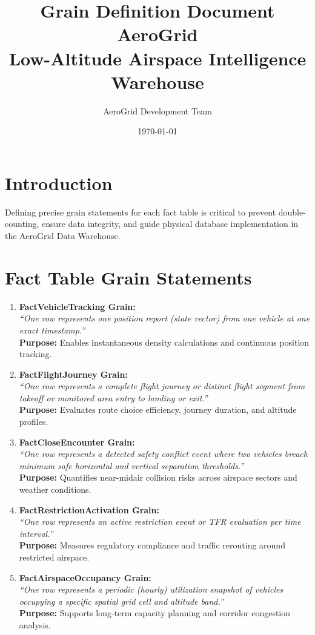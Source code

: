 \documentclass[11pt,a4paper]{article}
\title{\textbf{Grain Definition Document}\\[0.5cm] \textbf{AeroGrid}\\[0.3cm] Low-Altitude Airspace Intelligence Warehouse}
\author{AeroGrid Development Team}
\date{\today}
\begin{document}
\maketitle

\section{Introduction}
Defining precise grain statements for each fact table is critical to prevent double-counting, ensure data integrity, and guide physical database implementation in the AeroGrid Data Warehouse.

\section{Fact Table Grain Statements}

\begin{enumerate}
    \item \textbf{FactVehicleTracking Grain:} \\
    \textit{``One row represents one position report (state vector) from one vehicle at one exact timestamp.''} \\
    \textbf{Purpose:} Enables instantaneous density calculations and continuous position tracking.

    \item \textbf{FactFlightJourney Grain:} \\
    \textit{``One row represents a complete flight journey or distinct flight segment from takeoff or monitored area entry to landing or exit.''} \\
    \textbf{Purpose:} Evaluates route choice efficiency, journey duration, and altitude profiles.

    \item \textbf{FactCloseEncounter Grain:} \\
    \textit{``One row represents a detected safety conflict event where two vehicles breach minimum safe horizontal and vertical separation thresholds.''} \\
    \textbf{Purpose:} Quantifies near-midair collision risks across airspace sectors and weather conditions.

    \item \textbf{FactRestrictionActivation Grain:} \\
    \textit{``One row represents an active restriction event or TFR evaluation per time interval.''} \\
    \textbf{Purpose:} Measures regulatory compliance and traffic rerouting around restricted airspace.

    \item \textbf{FactAirspaceOccupancy Grain:} \\
    \textit{``One row represents a periodic (hourly) utilization snapshot of vehicles occupying a specific spatial grid cell and altitude band.''} \\
    \textbf{Purpose:} Supports long-term capacity planning and corridor congestion analysis.
\end{enumerate}
\end{document}
